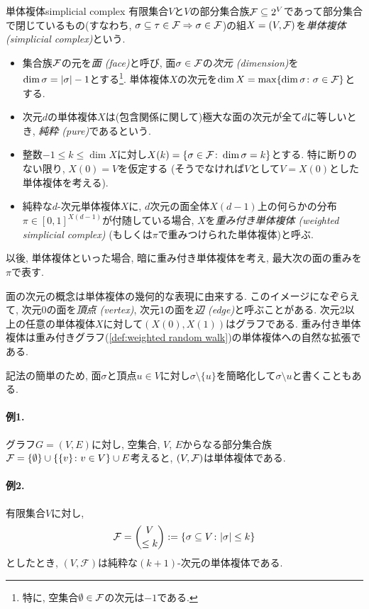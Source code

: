\begin{definition}{単体複体}{simplicial complex}
有限集合$V$と$V$の部分集合族$\F\subseteq 2^V$であって部分集合で閉じているもの(すなわち, $\sigma\subseteq \tau \in \F \Rightarrow \sigma\in \F$)の組$X=(V,\F)$を\emph{単体複体 (simplicial complex)}という.
\begin{itemize}
\item 集合族$\F$の元を\emph{面 (face)}と呼び,
面$\sigma \in \F$の\emph{次元 (dimension)}を$\dim \sigma = \abs{\sigma} - 1$とする\footnote{特に, 空集合$\emptyset \in \F$の次元は$-1$である.}.
単体複体$X$の次元を$\dim X = \max\cbra{\dim \sigma \colon \sigma \in \F}$とする.

\item 次元$d$の単体複体$X$は(包含関係に関して)極大な面の次元が全て$d$に等しいとき, \emph{純粋 (pure)}であるという.

\item 整数$-1 \le k \le \dim X$に対し$X(k) = \cbra*{\sigma \in \F\colon \dim \sigma = k }$とする.
特に断りのない限り, $X(0)=V$を仮定する
(そうでなければ$V$として$V=X(0)$とした単体複体を考える).

\item 純粋な$d$-次元単体複体$X$に, $d$次元の面全体$X(d-1)$上の何らかの分布$\pi \in [0,1]^{X(d-1)}$が付随している場合, $X$を\emph{重み付き単体複体 (weighted simplicial complex)} (もしくは$\pi$で重みつけられた単体複体)と呼ぶ.
\end{itemize}
以後, 単体複体といった場合, 暗に重み付き単体複体を考え, 最大次の面の重みを$\pi$で表す.
\end{definition}
面の次元の概念は単体複体の幾何的な表現に由来する.
このイメージになぞらえて,
次元$0$の面を\emph{頂点 (vertex)}, 次元$1$の面を\emph{辺 (edge)}と呼ぶことがある.
次元$2$以上の任意の単体複体$X$に対して$(X(0),X(1))$はグラフである.
重み付き単体複体は重み付きグラフ(\cref{def:weighted random walk})の単体複体への自然な拡張である.

記法の簡単のため, 面$\sigma$と頂点$u\in V$に対し$\sigma \setminus \{u\}$を簡略化して$\sigma \setminus u$と書くこともある.

\paragraph*{例1.}
グラフ$G=(V,E)$に対し, 空集合, $V$, $E$からなる部分集合族
$\F = \{\emptyset\} \cup \cbra*{\{v\}\colon v \in V} \cup E$考えると,
$(V,\F)$は単体複体である.

\paragraph*{例2.}
有限集合$V$に対し,
\begin{align}
    \F = \binom{V}{\le k} \defeq \cbra*{ \sigma \subseteq V \colon |\sigma|\le k} \label{eq:uniform matroid}
\end{align}
としたとき, $(V,\mathcal{F})$は純粋な$(k+1)$-次元の単体複体である.


